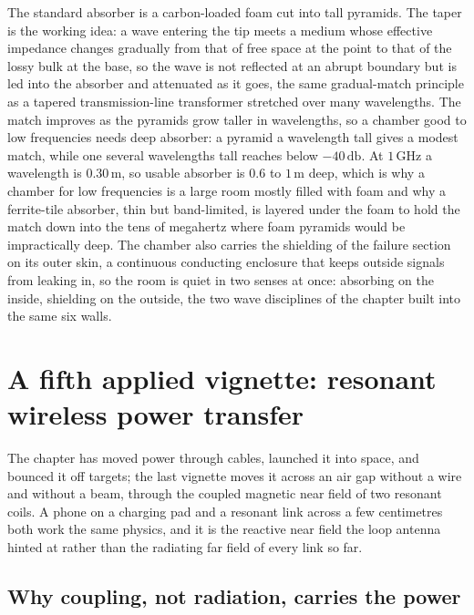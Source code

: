 The standard absorber is a carbon-loaded foam cut into tall pyramids. The
taper is the working idea: a wave entering the tip meets a medium whose
effective impedance changes gradually from that of free space at the point
to that of the lossy bulk at the base, so the wave is not reflected at an
abrupt boundary but is led into the absorber and attenuated as it goes,
the same gradual-match principle as a tapered transmission-line
transformer stretched over many wavelengths. The match improves as the
pyramids grow taller in wavelengths, so a chamber good to low frequencies
needs deep absorber: a pyramid a wavelength tall gives a modest match,
while one several wavelengths tall reaches below $-40\,\si{\decibel}$. At
$1\,\si{\giga\hertz}$ a wavelength is $0.30\,\si{\meter}$, so
usable absorber is $0.6$ to $1\,\si{\meter}$ deep, which is why a chamber
for low frequencies is a large room mostly filled with foam and why a
ferrite-tile absorber, thin but band-limited, is layered under the foam to
hold the match down into the tens of megahertz where foam pyramids would
be impractically deep. The chamber also carries the shielding of the
failure section on its outer skin, a continuous conducting enclosure that
keeps outside signals from leaking in, so the room is quiet in two senses
at once: absorbing on the inside, shielding on the outside, the two wave
disciplines of the chapter built into the same six walls.

\section{A fifth applied vignette: resonant wireless power
transfer}

The chapter has moved power through cables, launched it into space, and
bounced it off targets; the last vignette moves it across an air gap
without a wire and without a beam, through the coupled magnetic near field
of two resonant coils. A phone on a charging pad and a resonant link
across a few centimetres both work the same physics, and it is the reactive
near field the loop antenna hinted at rather than the radiating far field of
every link so far.

\subsection{Why coupling, not radiation, carries the power}

